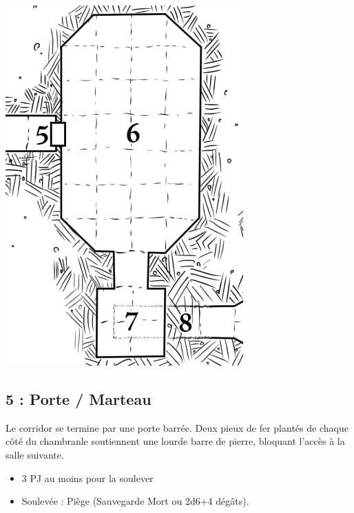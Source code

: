 \newpage
\begin{center}
  \includegraphics[width=\columnwidth]{pics/map_5-8.jpg}
\end{center} 

\subsection{5 : Porte / Marteau}\label{n1:s5}
Le corridor se termine par une porte barrée. 
Deux pieux de fer plantés de chaque côté du chambranle soutiennent une lourde barre de pierre, bloquant l’accès à la salle suivante.

\begin{itemize}
  \item 3 PJ au moins pour la soulever
  \item Soulevée : Piège (Sauvegarde Mort ou 2d6+4 dégâts).
\end{itemize}

